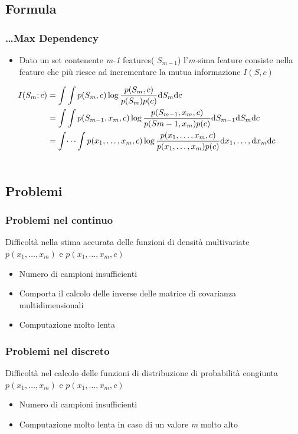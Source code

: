 \documentclass{beamer}
\begin{document}
\subsection{Formula}
\begin{frame}
	\frametitle{\dots Max Dependency}
	\begin{itemize}
		\item Dato un set contenente \emph{m-1} features( $S_{m-1}$) l'\emph{m-}sima feature consiste  nella feature che più riesce ad incrementare la mutua informazione $I(S,c)$
	\end{itemize}
	
	\begin{align*}
	\hspace*{-0.6cm}
	I (S_m;c) &= \int\int p(S_m,c)\log \frac{p(S_m,c)}{p(S_m)p(c)} \mathrm{d}S_m \mathrm{d}c \\
	&= \int\int p(S_{m-1},x_m,c)\log \frac{p(S_{m-1},x_m,c)}{p(S{m-1},x_m)p(c)} \mathrm{d}S_{m-1}\mathrm{d}S_m\mathrm{d}c \\
	&=\int\dots\int p(x_1,\dots,x_m,c)\log \frac{p(x_1,\dots,x_m,c)}{p(x_1,\dots,x_m)p(c)} \mathrm{d}x_1,\dots,\mathrm{d}x_m \mathrm{d}c \\\\
	\end{align*}

\end{frame}

\subsection{Problemi}
\begin{frame}
	\frametitle{Problemi nel continuo}
	Difficoltà nella stima accurata delle funzioni di densità multivariate $p(x_1,\dots,x_m)$ e $p(x_1,\dots,x_m,c)$
	\begin{itemize}
		\item Numero di campioni insufficienti
		\item Comporta il calcolo delle inverse delle matrice di covarianza multidimensionali
		\item Computazione molto lenta
	\end{itemize}
\end{frame}

\begin{frame}
	\frametitle{Problemi nel discreto}
	Difficoltà nel calcolo delle funzioni di distribuzione di probabilità congiunta $p(x_1,\dots,x_m)$ e $p(x_1,\dots,x_m,c)$
	\begin{itemize}
		\item Numero di campioni insufficienti
		\item Computazione molto lenta in caso di un valore \emph{m} molto alto
	\end{itemize}
\end{frame}
\end{document}
